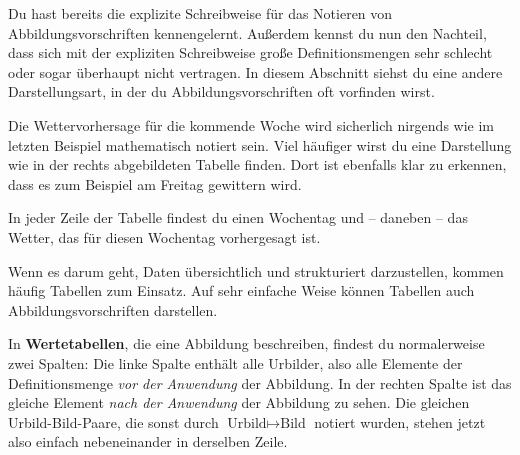 \documentclass[../../main.tex]{subfiles}
\begin{document}
Du hast bereits die explizite Schreibweise für das Notieren von Abbildungsvorschriften kennengelernt. Außerdem kennst du nun den Nachteil, dass sich mit der expliziten Schreibweise große Definitionsmengen sehr schlecht oder sogar überhaupt nicht vertragen. In diesem Abschnitt siehst du eine andere Darstellungsart, in der du Abbildungsvorschriften oft vorfinden wirst.

\begin{example}
    
    Die Wettervorhersage für die kommende Woche wird sicherlich nirgends wie im letzten Beispiel mathematisch notiert sein. Viel häufiger wirst du eine Darstellung wie in der rechts abgebildeten Tabelle finden. Dort ist ebenfalls klar zu erkennen, dass es zum Beispiel am Freitag gewittern wird.
    
    In jeder Zeile der Tabelle findest du einen Wochentag und -- daneben -- das Wetter, das für diesen Wochentag vorhergesagt ist.
\end{example}

Wenn es darum geht, Daten übersichtlich und strukturiert darzustellen, kommen häufig Tabellen zum Einsatz. Auf sehr einfache Weise können Tabellen auch Abbildungsvorschriften darstellen.

In \textbf{Wertetabellen}, die eine Abbildung beschreiben, findest du normalerweise zwei Spalten: Die linke Spalte enthält alle Urbilder, also alle Elemente der Definitionsmenge \emph{vor der Anwendung} der Abbildung. In der rechten Spalte ist das gleiche Element \emph{nach der Anwendung} der Abbildung zu sehen. Die gleichen Urbild-Bild-Paare, die sonst durch $\text{Urbild}\mapsto\text{Bild}$ notiert wurden, stehen jetzt also einfach nebeneinander in derselben Zeile.

\end{document}
